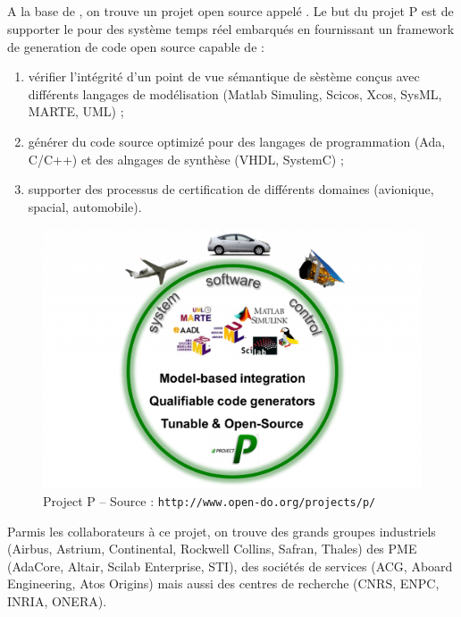 \subsection{}
A la base de , on trouve un projet open source appelé
. Le but du projet P est de supporter le  pour des
système temps réel embarqués en fournissant un framework de generation de code
open source capable de :
\begin{enumerate}
  \item vérifier l'intégrité d'un point de vue sémantique de sèstème conçus avec
	différents langages de modélisation (Matlab\up{\circledR}
	Simuling\up{\circledR}, Scicos, Xcos, SysML, MARTE, UML) ;
  \item générer du code source optimizé pour des langages de programmation
	(Ada, C/C++) et des alngages de synthèse (VHDL, SystemC) ;
  \item supporter des processus de certification de différents domaines
	(avionique, spacial, automobile).
\end{enumerate}

\begin{figure}[h]
  \centering
  \includegraphics[scale=0.3]{images/projectp}
  \caption{Project P -- Source : {\tt http://www.open-do.org/projects/p/}}
  \label{fig:projectp}
\end{figure}

Parmis les collaborateurs à ce projet, on trouve des grands groupes industriels
(Airbus, Astrium, Continental, Rockwell Collins, Safran, Thales) des PME
(AdaCore, Altair, Scilab Enterprise, STI), des sociétés de services (ACG, Aboard
Engineering, Atos Origins) mais aussi des centres de recherche (CNRS, ENPC,
INRIA, ONERA).\\

